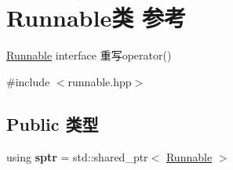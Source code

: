 \hypertarget{classRunnable}{}\section{Runnable类 参考}
\label{classRunnable}


\hyperlink{classRunnable}{Runnable} interface 重写operator()  




{\ttfamily \#include $<$runnable.\+hpp$>$}

\subsection*{Public 类型}
\begin{DoxyCompactItemize}
\item 
\mbox{\label{classRunnable_abe8d3066c7305401d6f0aad8e70780f2}} 
using {\bfseries sptr} = std\+::shared\+\_\+ptr$<$ \hyperlink{classRunnable}{Runnable} $>$
\end{DoxyCompactItemize}
